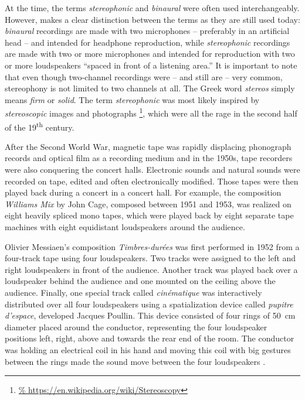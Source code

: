 At the time,
the terms \emph{stereophonic} and \emph{binaural}
were often used interchangeably.
However, \textcite{snow1953stereo} makes a clear distinction
between the terms as they are still used today:
\emph{binaural} recordings are made with two microphones
-- preferably in an artificial head --
and intended for headphone reproduction,
while \emph{stereophonic} recordings are made with two or more microphones
and intended for reproduction with two or more loudspeakers
``spaced in front of a listening area.''
It is important to note that even though two-channel recordings
were -- and still are -- very common,
stereophony is not limited to two channels at all.
The Greek word \emph{stereos} simply means \emph{firm} or \emph{solid}.
The term \emph{stereophonic} was most likely inspired
by \emph{stereoscopic} images and photographs \footnote{\url{%
https://en.wikipedia.org/wiki/Stereoscopy}},
which were all the rage
in the second half of the 19\textsuperscript{th} century.

After the Second World War,
magnetic tape was rapidly displacing
phonograph records and optical film as a recording medium and
in the 1950s,
tape recorders were also conquering the concert halls.
Electronic sounds and natural sounds were recorded on tape,
edited and often electronically modified.
Those tapes were then played back during a concert in a concert hall.
For example, the composition \emph{Williams Mix} by
John Cage, composed between 1951 and 1953,
was realized on eight heavily spliced mono tapes,
which were played back by eight separate tape machines
with eight equidistant loudspeakers around the audience.

Olivier Messiaen's composition \emph{Timbres-durées}
was first performed in 1952
from a four-track tape using four loudspeakers.
Two tracks were assigned to the left and right loudspeakers
in front of the audience.
Another track was played back over a loudspeaker behind the audience
and one mounted on the ceiling above the audience.
Finally, one special track called \emph{cinématique}
was interactively distributed over all four loudspeakers
using a
spatialization device
called
\emph{pupitre d'espace},
developed Jacques Poullin.
This device consisted of four rings of \qty{50}{\centi\meter} diameter
placed around the conductor,
representing the four loudspeaker positions left, right, above and towards the
rear end of the room.
The conductor was holding an electrical coil in his hand
and moving this coil with big gestures between the rings
made the sound move between the four loudspeakers
\parencite{battier2015discoveries}.

